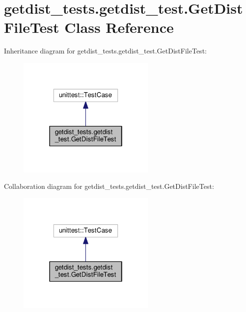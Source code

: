 \hypertarget{classgetdist__tests_1_1getdist__test_1_1GetDistFileTest}{}\section{getdist\+\_\+tests.\+getdist\+\_\+test.\+Get\+Dist\+File\+Test Class Reference}
\label{classgetdist__tests_1_1getdist__test_1_1GetDistFileTest}


Inheritance diagram for getdist\+\_\+tests.\+getdist\+\_\+test.\+Get\+Dist\+File\+Test\+:
\nopagebreak
\begin{figure}[H]
\begin{center}
\leavevmode
\includegraphics[width=190pt]{classgetdist__tests_1_1getdist__test_1_1GetDistFileTest__inherit__graph}
\end{center}
\end{figure}


Collaboration diagram for getdist\+\_\+tests.\+getdist\+\_\+test.\+Get\+Dist\+File\+Test\+:
\nopagebreak
\begin{figure}[H]
\begin{center}
\leavevmode
\includegraphics[width=190pt]{classgetdist__tests_1_1getdist__test_1_1GetDistFileTest__coll__graph}
\end{center}
\end{figure}

